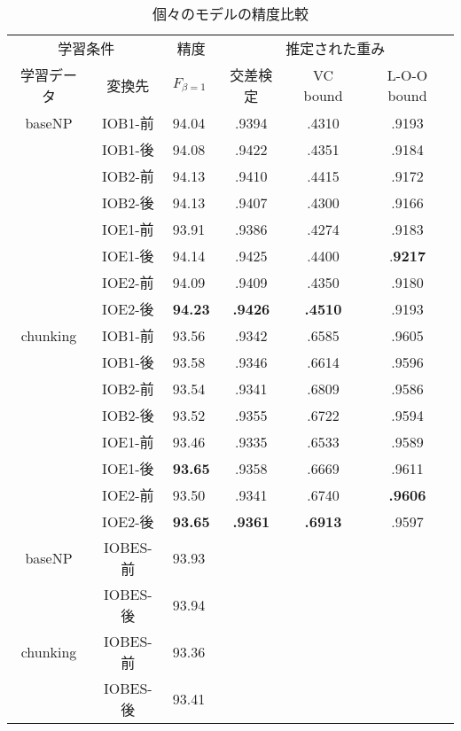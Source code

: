 \begin{table}
\begin{center}
\begin{tabular}{@{}c@{ }@{}c@{ }|p{}|ccc@{}}
\hline
\hline
\multicolumn{2}{c|}{学習条件} & \multicolumn{1}{c|}{精度} & \multicolumn{3}{c}{推定された重み}\\
 学習データ &  変換先 & $F_{\beta = 1}$ & 交差検定 & VC bound & L-O-O bound\\
\hline
 baseNP  &  IOB1-前 & 94.04 & .9394  & .4310 & .9193 \\
                   &  IOB1-後 & 94.08 & .9422  & .4351 & .9184 \\
                   &  IOB2-前 & 94.13 & .9410  & .4415 & .9172 \\
                   &  IOB2-後 & 94.13 & .9407  & .4300 & .9166 \\
                   &  IOE1-前 & 93.91 & .9386  & .4274 & .9183 \\
                   &  IOE1-後 & 94.14 & .9425  & .4400 & .{\bf 9217} \\
                   &  IOE2-前 & 94.09 & .9409  & .4350 & .9180 \\
                   &  IOE2-後 & {\bf 94.23} & {\bf .9426} & {\bf .4510} & .9193 \\
\hline
 chunking  &  IOB1-前 & 93.56 & .9342 & .6585 & .9605 \\
                   &  IOB1-後 & 93.58 & .9346 & .6614 & .9596 \\
                   &  IOB2-前 & 93.54 & .9341 & .6809 & .9586 \\
                   &  IOB2-後 & 93.52 & .9355 & .6722 & .9594 \\
                   &  IOE1-前 & 93.46 & .9335 & .6533 & .9589 \\
                   &  IOE1-後 & {\bf 93.65} & .9358 & .6669 & .9611 \\
                   &  IOE2-前 & 93.50 & .9341 & .6740 & {\bf .9606} \\
                   &  IOE2-後 & {\bf 93.65} & {\bf .9361} & {\bf .6913} & .9597 \\
\hline
\hline
 baseNP    &  IOBES-前 & 93.93 &  &  &  \\
           &  IOBES-後 & 93.94 &  &  &  \\
\hline
 chunking  &  IOBES-前 & 93.36 &  &  &  \\
           &  IOBES-後 & 93.41 &  &  &  \\
\end{tabular}
\end{center}
\caption{個々のモデルの精度比較}
\label{fg:ind}
\end{table}

